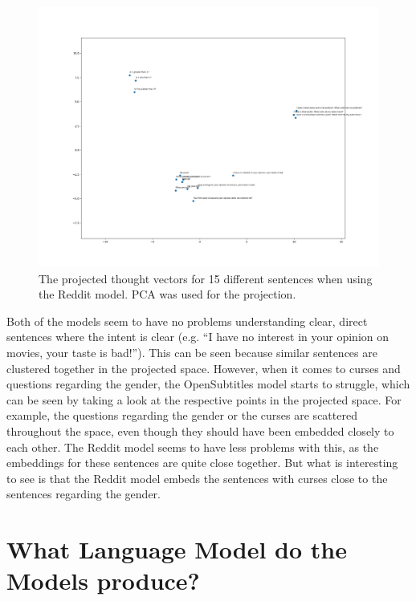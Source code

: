 \begin{figure}[H]
	\centering
	\includegraphics[width=16cm]{img/reddit_thought_vector_embeddings.png}
	\caption{The projected thought vectors for 15 different sentences when using the Reddit model. PCA was used for the projection.}
	\label{results:thougth_vectors:embeddings:reddit}
\end{figure}

Both of the models seem to have no problems understanding clear, direct sentences where the intent is clear (e.g. ``I have no interest in your opinion on movies, your taste is bad!''). This can be seen because similar sentences are clustered together in the projected space. However, when it comes to curses and questions regarding the gender, the OpenSubtitles model starts to struggle, which can be seen by taking a look at the respective points in the projected space. For example, the questions regarding the gender or the curses are scattered throughout the space, even though they should have been embedded closely to each other. The Reddit model seems to have less problems with this, as the embeddings for these sentences are quite close together. But what is interesting to see is that the Reddit model embeds the sentences with curses close to the sentences regarding the gender.



\section{What Language Model do the Models produce?}
\blindtext

